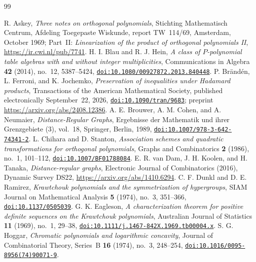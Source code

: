 \begin{thebibliography}{99}

 R. Askey, \emph{Three notes on orthogonal polynomials}, Stichting Mathematisch Centrum, Afdeling Toegepaste Wiskunde, report TW~114/69, Amsterdam, October 1969; Part~II: \emph{Linearization of the product of orthogonal polynomials II}, \url{https://ir.cwi.nl/pub/7741}.
 H. I. Blau and R. J. Hein, \emph{A class of $P$-polynomial table algebras with and without integer multiplicities}, Communications in Algebra \textbf{42} (2014), no.~12, 5387--5424, \href{https://doi.org/10.1080/00927872.2013.840448}{\nolinkurl{doi:10.1080/00927872.2013.840448}}.
 P. Br\"and\'en, L. Ferroni, and K. Jochemko, \emph{Preservation of inequalities under Hadamard products}, Transactions of the American Mathematical Society, published electronically September~22, 2026, \href{https://doi.org/10.1090/tran/9683}{\nolinkurl{doi:10.1090/tran/9683}}; preprint \url{https://arxiv.org/abs/2408.12386}.
 A. E. Brouwer, A. M. Cohen, and A. Neumaier, \emph{Distance-Regular Graphs}, Ergebnisse der Mathematik und ihrer Grenzgebiete (3), vol.~18, Springer, Berlin, 1989, \href{https://doi.org/10.1007/978-3-642-74341-2}{\nolinkurl{doi:10.1007/978-3-642-74341-2}}.
 L. Chihara and D. Stanton, \emph{Association schemes and quadratic transformations for orthogonal polynomials}, Graphs and Combinatorics \textbf{2} (1986), no.~1, 101--112, \href{https://doi.org/10.1007/BF01788084}{\nolinkurl{doi:10.1007/BF01788084}}.
 E. R. van Dam, J. H. Koolen, and H. Tanaka, \emph{Distance-regular graphs}, Electronic Journal of Combinatorics (2016), Dynamic Survey DS22, \url{https://arxiv.org/abs/1410.6294}.
 C. F. Dunkl and D. E. Ramirez, \emph{Krawtchouk polynomials and the symmetrization of hypergroups}, SIAM Journal on Mathematical Analysis \textbf{5} (1974), no.~3, 351--366, \href{https://doi.org/10.1137/0505039}{\nolinkurl{doi:10.1137/0505039}}.
 G. K. Eagleson, \emph{A characterization theorem for positive definite sequences on the Krawtchouk polynomials}, Australian Journal of Statistics \textbf{11} (1969), no.~1, 29--38, \href{https://doi.org/10.1111/j.1467-842X.1969.tb00004.x}{\nolinkurl{doi:10.1111/j.1467-842X.1969.tb00004.x}}.
 S. G. Hoggar, \emph{Chromatic polynomials and logarithmic concavity}, Journal of Combinatorial Theory, Series~B \textbf{16} (1974), no.~3, 248--254, \href{https://doi.org/10.1016/0095-8956(74)90071-9}{\nolinkurl{doi:10.1016/0095-8956(74)90071-9}}.

\end{thebibliography}
